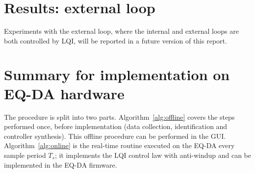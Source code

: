 \documentclass[12pt,a4paper]{article}
\begin{document}
\clearpage
\section{Results: external loop}
Experiments with the external loop, where the internal and external loops are both
controlled by LQI, will be reported in a future version of this report.

\clearpage
\section{Summary for implementation on EQ-DA hardware}
The procedure is split into two parts. Algorithm~\ref{alg:offline} covers the steps performed once, before implementation (data collection, identification and controller synthesis). This offline procedure can be performed in the GUI. Algorithm~\ref{alg:online} is the real-time routine executed on the EQ-DA every sample period $T_s$; it implements the LQI control law with anti-windup and can be implemented in the EQ-DA firmware.
\renewcommand{\algorithmicrequire}{\textbf{Input:}}
\renewcommand{\algorithmicensure}{\textbf{Output:}}
\end{document}
